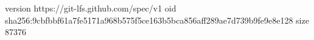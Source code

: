 version https://git-lfs.github.com/spec/v1
oid sha256:9cbfbbf61a7fe5171a968b575f5ce163b5bca856aff289ae7d739b9fe9e8e128
size 87376
